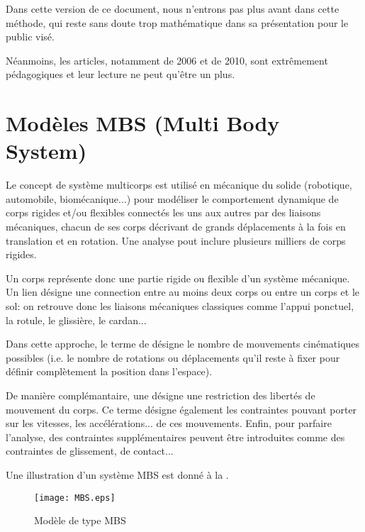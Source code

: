 \medskip
Dans cette version de ce document, nous n'entrons pas plus avant dans cette
méthode, qui reste sans doute trop mathématique dans sa présentation
pour le public visé.

Néanmoins, les articles, notamment de 2006 et de 2010, sont extrêmement
pédagogiques et leur lecture ne peut qu'être un plus.





\medskip
\section{Modèles MBS (Multi Body System)}\label{Sec-MBS}

Le concept de système multicorps est utilisé en mécanique du solide (robotique, automobile,
biomécanique...) pour modéliser le comportement dynamique de corps rigides et/ou flexibles 
connectés les uns aux autres par des liaisons mécaniques, chacun de ses corps décrivant de 
grands déplacements à la fois en translation et en rotation. Une analyse pout inclure plusieurs 
milliers de corps rigides.

 

\medskip
Un corps représente donc une partie rigide ou flexible d'un système mécanique.
Un lien désigne une connection entre au moins deux corps ou entre un corps et le sol: 
on retrouve donc les liaisons mécaniques classiques comme l'appui ponctuel, la rotule,
le glissière, le cardan...

\medskip
Dans cette approche, le terme de  désigne le nombre de mouvements
cinématiques possibles (i.e. le nombre de rotations ou déplacements qu'il reste à fixer
pour définir complètement la position dans l'espace).

De manière complémantaire, une  désigne
une restriction des libertés de mouvement du corps. Ce terme désigne également les
contraintes pouvant porter sur les vitesses, les accélérations... de ces mouvements.
Enfin, pour parfaire l'analyse, des contraintes supplémentaires peuvent être introduites
comme des contraintes de glissement, de contact...

Une illustration d'un système MBS est donné à la .
\begin{figure}[htb]
\centerline{\texttt{[image: MBS.eps]}}
\caption{Modèle de type MBS}\label{Fig-MBS}
\end{figure}

